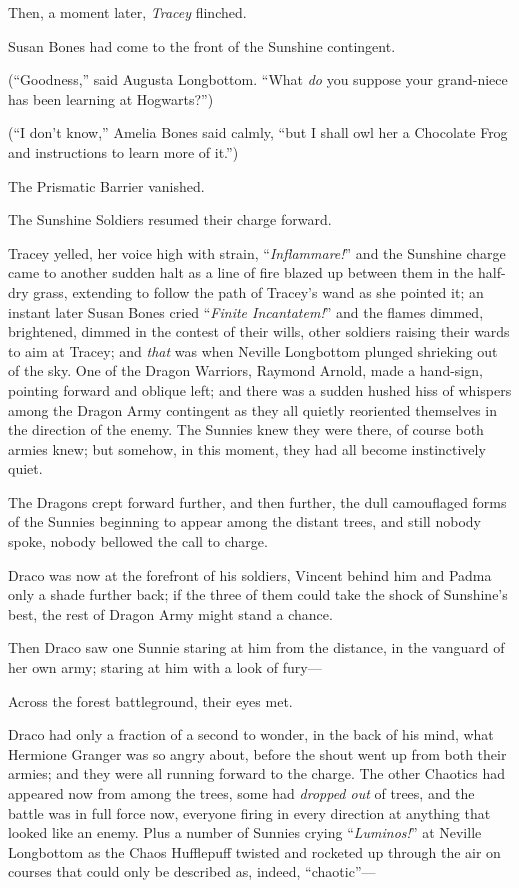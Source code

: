 Then, a moment later, \emph{Tracey} flinched.

Susan Bones had come to the front of the Sunshine contingent.

(“Goodness,” said Augusta Longbottom. “What \emph{do} you suppose your
grand-niece has been learning at Hogwarts?”)

(“I don’t know,” Amelia Bones said calmly, “but I shall owl her a Chocolate
Frog and instructions to learn more of it.”)

The Prismatic Barrier vanished.

The Sunshine Soldiers resumed their charge forward.

Tracey yelled, her voice high with strain, “\emph{Inflammare!}” and the
Sunshine charge came to another sudden halt as a line of fire blazed up between
them in the half-dry grass, extending to follow the path of Tracey’s wand as
she pointed it; an instant later Susan Bones cried “\emph{Finite Incantatem!}”
and the flames dimmed, brightened, dimmed in the contest of their wills, other
soldiers raising their wards to aim at Tracey; and \emph{that} was when Neville
Longbottom plunged shrieking out of the sky.
\later
One of the Dragon Warriors, Raymond Arnold, made a hand-sign, pointing forward
and oblique left; and there was a sudden hushed hiss of whispers among the
Dragon Army contingent as they all quietly reoriented themselves in the
direction of the enemy. The Sunnies knew they were there, of course both armies
knew; but somehow, in this moment, they had all become instinctively quiet.

The Dragons crept forward further, and then further, the dull camouflaged forms
of the Sunnies beginning to appear among the distant trees, and still nobody
spoke, nobody bellowed the call to charge.

Draco was now at the forefront of his soldiers, Vincent behind him and Padma
only a shade further back; if the three of them could take the shock of
Sunshine’s best, the rest of Dragon Army might stand a chance.

Then Draco saw one Sunnie staring at him from the distance, in the vanguard of
her own army; staring at him with a look of fury—

Across the forest battleground, their eyes met.

Draco had only a fraction of a second to wonder, in the back of his mind, what
Hermione Granger was so angry about, before the shout went up from both their
armies; and they were all running forward to the charge.
\later
The other Chaotics had appeared now from among the trees, some had
\emph{dropped out} of trees, and the battle was in full force now, everyone
firing in every direction at anything that looked like an enemy. Plus a number
of Sunnies crying “\emph{Luminos!}” at Neville Longbottom as the Chaos
Hufflepuff twisted and rocketed up through the air on courses that could only
be described as, indeed, “chaotic”—

